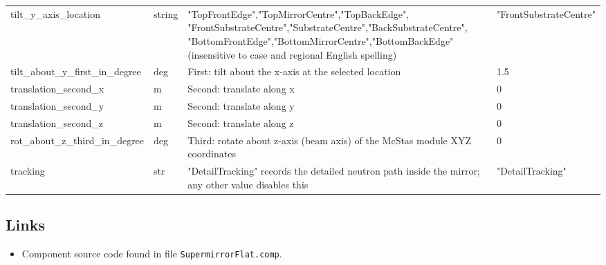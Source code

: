 \begin{longtable}{p{}p{}p{}p{}}
tilt\_y\_axis\_location & string & "TopFrontEdge","TopMirrorCentre","TopBackEdge", "FrontSubstrateCentre","SubstrateCentre","BackSubstrateCentre", "BottomFrontEdge","BottomMirrorCentre","BottomBackEdge"  (insensitive to case and regional English spelling) & "FrontSubstrateCentre" \\
tilt\_about\_y\_first\_in\_degree & deg & First: tilt about the x-axis at the selected location & 1.5 \\
translation\_second\_x & m & Second: translate along x & 0 \\
translation\_second\_y & m & Second: translate along y & 0 \\
translation\_second\_z & m & Second: translate along z & 0 \\
rot\_about\_z\_third\_in\_degree & deg & Third: rotate about z-axis (beam axis) of the McStas module XYZ coordinates & 0 \\
tracking & str & "DetailTracking" records the detailed neutron path inside the mirror; any other value disables this & "DetailTracking" \\
\bottomrule
\end{longtable}

\subsection*{Links}
\begin{itemize}
  \item Component source code found in file \texttt{SupermirrorFlat.comp}.
\end{itemize}
